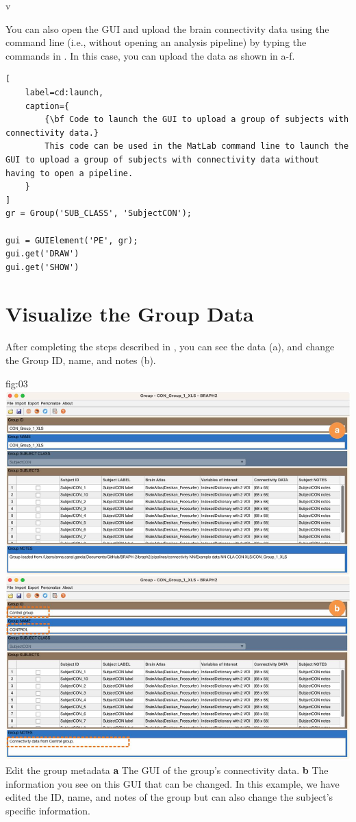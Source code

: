 v\documentclass[justified]{tufte-handout}
\begin{document}
\begin{tcolorbox}[
	title=GUI launch from command line
]
You can also open the GUI and upload the brain connectivity data using the command line (i.e., without opening an analysis pipeline) by typing the commands in . In this case, you can upload the data as shown in a-f.
%
\begin{lstlisting}[
	label=cd:launch,
	caption={
		{\bf Code to launch the GUI to upload a group of subjects with connectivity data.}
		This code can be used in the MatLab command line to launch the GUI to upload a group of subjects with connectivity data without having to open a pipeline.
	}
]
gr = Group('SUB_CLASS', 'SubjectCON');

gui = GUIElement('PE', gr);
gui.get('DRAW')
gui.get('SHOW')
\end{lstlisting}
\end{tcolorbox}

\section{Visualize the Group Data}

After completing the steps described in , you can see the data (a), and change the Group ID, name, and notes (b). 

	{fig:03}
	{
	\includegraphics{fig03.jpg}
	}
	{Edit the group metadata}
	{ 
	{\bf a} The GUI of the group's connectivity data. 
	{\bf b} The information you see on this GUI that can be changed. In this example, we have edited the ID, name, and notes of the group but can also change the subject's specific information.
	}
\end{document}
